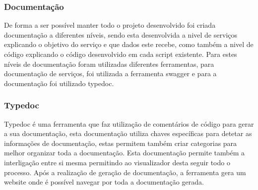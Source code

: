 \subsubsection{Documentação}
De forma a ser possível manter todo o projeto desenvolvido foi criada documentação a diferentes níveis, sendo esta desenvolvida a nivel de serviços explicando o objetivo do serviço e que dados este recebe, como também a nivel de código explicando o código desenvolvido em cada script existente. Para estes níveis de documentação foram utilizadas diferentes ferramentas, para documentação de serviços, foi utilizada a ferramenta swagger e para a documentação foi utilizado typedoc.

\subsubsection{Typedoc}
Typedoc é uma ferramenta que faz utilização de comentários de código para gerar a sua documentação, esta documentação utiliza chaves específicas para detetar as informações de documentação, estas permitem também criar categorias para melhor organizar toda a documentação. Esta documentação permite também a interligação entre si mesma permitindo ao visualizador desta seguir todo o processo. Após a realização de geração de documentação, a ferramenta gera um website onde é possível navegar por toda a documentação gerada.

